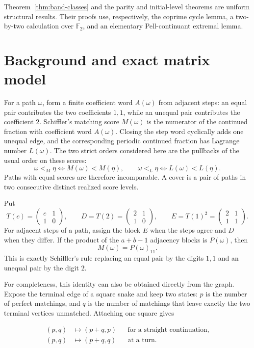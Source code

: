 \documentclass[11pt]{amsart}
\theoremstyle{definition}
\newcommand{\Ftwo}{\mathbb F_2}
\begin{document}
Theorem~\ref{thm:band-classes} and the parity and initial-level theorems are
uniform structural results.  Their proofs use, respectively, the coprime cycle
lemma, a two-by-two calculation over $\Ftwo$, and an elementary
Pell-continuant extremal lemma.

\section{Background and exact matrix model}\label{sec:matrices}

For a path $\omega$, form a finite coefficient word $A(\omega)$ from adjacent
steps: an equal pair contributes the two coefficients $1,1$, while an unequal
pair contributes the coefficient $2$.  Schiffler's matching score $M(\omega)$
is the numerator of the continued fraction with coefficient word
$A(\omega)$.  Closing the step word cyclically adds one unequal edge, and the
corresponding periodic continued fraction has Lagrange number $L(\omega)$.
The two strict orders considered here are the pullbacks of the usual order on
these scores:
\[
 \omega<_M\eta\iff M(\omega)<M(\eta),\qquad
 \omega<_L\eta\iff L(\omega)<L(\eta).
\]
Paths with equal scores are therefore incomparable.  A cover is a pair of
paths in two consecutive distinct realized score levels.

Put
\[
 T(c)=\begin{pmatrix}c&1\\1&0\end{pmatrix},\qquad
 D=T(2)=\begin{pmatrix}2&1\\1&0\end{pmatrix},\qquad
 E=T(1)^2=\begin{pmatrix}2&1\\1&1\end{pmatrix}.
\]
For adjacent steps of a path, assign the block $E$ when the steps agree and
$D$ when they differ.  If the product of the $a+b-1$ adjacency blocks is
$P(\omega)$, then
\[
  M(\omega)=P(\omega)_{11}.
\]
This is exactly Schiffler's rule replacing an equal pair by the digits $1,1$
and an unequal pair by the digit $2$.

For completeness, this identity can also be obtained directly from the graph.
Expose the terminal edge of a square snake and keep two states: $p$ is the
number of perfect matchings, and $q$ is the number of matchings that leave
exactly the two terminal vertices unmatched.  Attaching one square gives

\begin{align*}
 (p,q)&\longmapsto(p+q,p)
   &&\text{for a straight continuation},\\
 (p,q)&\longmapsto(p+q,q)
   &&\text{at a turn}.
\end{align*}
\end{document}
